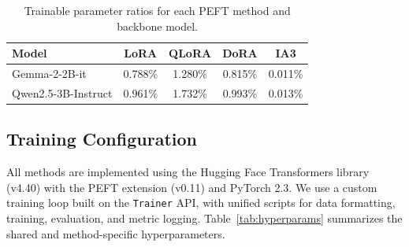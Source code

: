 \documentclass{article}
\begin{document}
\begin{table}[H]
\centering
\small
\caption{Trainable parameter ratios for each PEFT method and backbone model.}
\label{tab:trainable}
\begin{tabular}{lcccc}
\toprule
Model & LoRA & QLoRA & DoRA & IA3 \\
\midrule
Gemma-2-2B-it & 0.788\% & 1.280\% & 0.815\% & 0.011\% \\
Qwen2.5-3B-Instruct & 0.961\% & 1.732\% & 0.993\% & 0.013\% \\
\bottomrule
\end{tabular}
\end{table}

\subsection{Training Configuration}

All methods are implemented using the Hugging Face Transformers library (v4.40) \cite{wolf2020transformers} with the PEFT extension (v0.11) \cite{peft2022} and PyTorch 2.3. We use a custom training loop built on the \texttt{Trainer} API, with unified scripts for data formatting, training, evaluation, and metric logging. Table~\ref{tab:hyperparams} summarizes the shared and method-specific hyperparameters.
\end{document}
